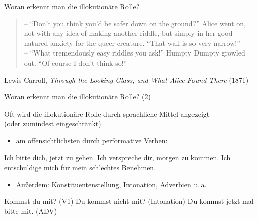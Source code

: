 \begin{frame}{Woran erkennt man die illokutionäre Rolle?}
 
  \begin{quote}
    -- ``Don't you think you'd be safer down on the ground?'' Alice went on, not with any idea of making another riddle, but simply in her good-natured anxiety for the queer creature. ``That wall is so very narrow!''\\
 -- ``What tremendously easy riddles you ask!'' Humpty Dumpty growled out. ``Of course I don't think so!''
  \end{quote}

 {\small Lewis Carroll, \textit{Through the Looking-Glass, and What Alice Found There} (1871)}


\end{frame}


\begin{frame}{Woran erkennt man die illokutionäre Rolle? (2)}

Oft wird die illokutionäre Rolle durch sprachliche Mittel angezeigt\\ (oder zumindest eingeschränkt).
\pause

\begin{itemize}
\item am offensichtlichsten durch \alert{performative Verben}:
\end{itemize}

\begin{exe}
  \ex Ich \alert{bitte} dich, jetzt zu gehen.
  \ex Ich \alert{verspreche} dir, morgen zu kommen.
  \ex Ich \alert{entschuldige} mich für mein schlechtes Benehmen.
\end{exe}
\pause


\begin{itemize}
\item Außerdem: Konstituentenstellung, Intonation, Adverbien u.\,a.
\end{itemize}
\pause

\begin{exe}
  \ex Kommst du mit? (V1)
  \ex Du kommst nicht mit? (Intonation)
  \ex Du kommst jetzt mal bitte mit. (ADV)
\end{exe}

\end{frame}


